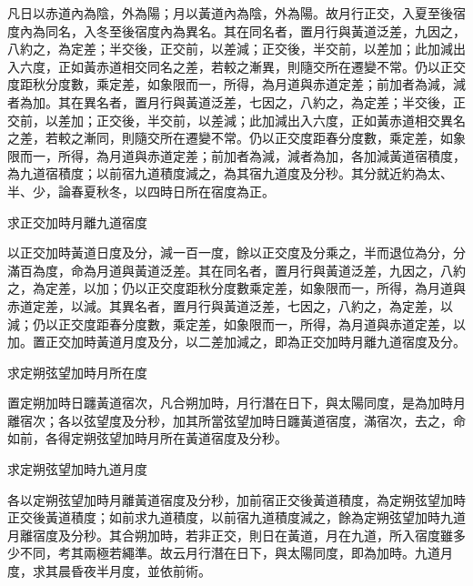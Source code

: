 \begin{pinyinscope}
 凡日以赤道內為陰，外為陽；月以黃道內為陰，外為陽。故月行正交，入夏至後宿度內為同名，入冬至後宿度內為異名。其在同名者，置月行與黃道泛差，九因之，八約之，為定差；半交後，正交前，以差減；正交後，半交前，以差加；此加減出入六度，正如黃赤道相交同名之差，若較之漸異，則隨交所在遷變不常。仍以正交度距秋分度數，乘定差，如象限而一，所得，為月道與赤道定差；前加者為減，減者為加。其在異名者，置月行與黃道泛差，七因之，八約之，為定差；半交後，正交前，以差加；正交後，半交前，以差減；此加減出入六度，正如黃赤道相交異名之差，若較之漸同，則隨交所在遷變不常。仍以正交度距春分度數，乘定差，如象限而一，所得，為月道與赤道定差；前加者為減，減者為加，各加減黃道宿積度，為九道宿積度；以前宿九道積度減之，為其宿九道度及分秒。其分就近約為太、半、少，論春夏秋冬，以四時日所在宿度為正。



 求正交加時月離九道宿度



 以正交加時黃道日度及分，減一百一度，餘以正交度及分乘之，半而退位為分，分滿百為度，命為月道與黃道泛差。其在同名者，置月行與黃道泛差，九因之，八約之，為定差，以加；仍以正交度距秋分度數乘定差，如象限而一，所得，為月道與赤道定差，以減。其異名者，置月行與黃道泛差，七因之，八約之，為定差，以減；仍以正交度距春分度數，乘定差，如象限而一，所得，為月道與赤道定差，以加。置正交加時黃道月度及分，以二差加減之，即為正交加時月離九道宿度及分。



 求定朔弦望加時月所在度



 置定朔加時日躔黃道宿次，凡合朔加時，月行潛在日下，與太陽同度，是為加時月離宿次；各以弦望度及分秒，加其所當弦望加時日躔黃道宿度，滿宿次，去之，命如前，各得定朔弦望加時月所在黃道宿度及分秒。



 求定朔弦望加時九道月度



 各以定朔弦望加時月離黃道宿度及分秒，加前宿正交後黃道積度，為定朔弦望加時正交後黃道積度；如前求九道積度，以前宿九道積度減之，餘為定朔弦望加時九道月離宿度及分秒。其合朔加時，若非正交，則日在黃道，月在九道，所入宿度雖多少不同，考其兩極若繩準。故云月行潛在日下，與太陽同度，即為加時。九道月度，求其晨昏夜半月度，並依前術。



\end{pinyinscope}